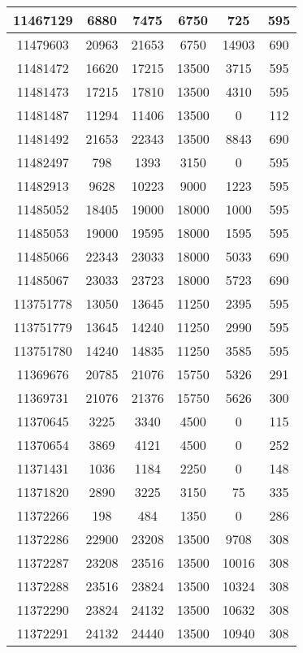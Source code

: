 \begin{appendices}
\begin{center}
\begin{longtable}{|c|c|c|c|c|c|}
11467129 & 6880  & 7475  & 6750  & 725   & 595 \\ \hline
11479603 & 20963 & 21653 & 6750  & 14903 & 690 \\ \hline
11481472 & 16620 & 17215 & 13500 & 3715  & 595 \\ \hline
11481473 & 17215 & 17810 & 13500 & 4310  & 595 \\ \hline
11481487 & 11294 & 11406 & 13500 & 0     & 112 \\ \hline
11481492 & 21653 & 22343 & 13500 & 8843  & 690 \\ \hline
11482497 & 798   & 1393  & 3150  & 0     & 595 \\ \hline
11482913 & 9628  & 10223 & 9000  & 1223  & 595 \\ \hline
11485052 & 18405 & 19000 & 18000 & 1000  & 595 \\ \hline
11485053 & 19000 & 19595 & 18000 & 1595  & 595 \\ \hline
11485066 & 22343 & 23033 & 18000 & 5033  & 690 \\ \hline
11485067 & 23033 & 23723 & 18000 & 5723  & 690 \\ \hline
113751778 & 13050 & 13645 & 11250 & 2395  & 595 \\ \hline
113751779 & 13645 & 14240 & 11250 & 2990  & 595 \\ \hline
113751780 & 14240 & 14835 & 11250 & 3585  & 595 \\ \hline
11369676 & 20785 & 21076 & 15750 & 5326  & 291 \\ \hline
11369731 & 21076 & 21376 & 15750 & 5626  & 300 \\ \hline
11370645 & 3225  & 3340  & 4500  & 0     & 115 \\ \hline
11370654 & 3869  & 4121  & 4500  & 0     & 252 \\ \hline
11371431 & 1036  & 1184  & 2250  & 0     & 148 \\ \hline
11371820 & 2890  & 3225  & 3150  & 75    & 335 \\ \hline
11372266 & 198   & 484   & 1350  & 0     & 286 \\ \hline
11372286 & 22900 & 23208 & 13500 & 9708  & 308 \\ \hline
11372287 & 23208 & 23516 & 13500 & 10016 & 308 \\ \hline
11372288 & 23516 & 23824 & 13500 & 10324 & 308 \\ \hline
11372290 & 23824 & 24132 & 13500 & 10632 & 308 \\ \hline
11372291 & 24132 & 24440 & 13500 & 10940 & 308 \\ \hline

\end{longtable}
\end{center}
\end{appendices}
